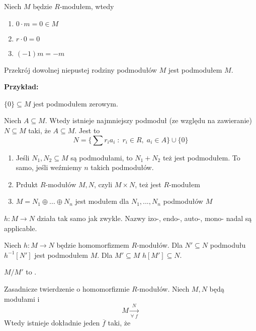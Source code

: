 \begin{remark}
    Niech $M$ będzie $R$-modułem, wtedy
    \begin{enumerate}
    \item $0\cdot m=0\in M$
    \item $r\cdot 0=0$
    \item $(-1)m=-m$
    \end{enumerate}
\end{remark}

\begin{remark}
Przekrój dowolnej niepustej rodziny podmodułów $M$ jest podmodułem $M$.
\end{remark}

\textbf{Przykład:}

$\{0\}\subseteq M$ jest podmodułem zerowym.

\begin{conclusion}
    Niech $A\subseteq M$. Wtedy istnieje najmniejszy podmoduł (ze względu na zawieranie) $N\subseteq M$ taki, że $A\subseteq M$. Jest to 
    $$N=\{\sum r_ia_i\;:\;r_i\in R,\;a_i\in A\}\cup\{0\}$$
\end{conclusion}

\begin{enumerate}
    \item Jeśli $N_1,N_2\subseteq M$ są podmodułami, to $N_1+N_2$ też jest podmodułem. To samo, jeśli weźmiemy $n$ takich podmodułów.
    \item Prdukt $R$-modułów $M,N$, czyli $M\times N$, też jest $R$-modułem
    \item $M=N_1\oplus...\oplus N_n$ jest modułem dla $N_1,...,N_n$ podmodułów $M$
\end{enumerate}

 $h:M\to N$ działa tak samo jak zwykle. Nazwy izo-, endo-, auto-, mono- nadal są applicable.

Niech $h:M\to N$ będzie homomorfizmem $R$-modułów. Dla $N'\subseteq N$ podmodułu $h^{-1}[N']$ jest podmodułem $M$. Dla $M'\subseteq M$ $h[M']\subseteq N$. 

$M/M'$ to .

\begin{theorem} Zasadnicze twierdzenie o homomorfizmie $R$-modułów. Niech $M,N$ będą modułami i
$$M\xrightarrow[\forall\;f]N$$
Wtedy istnieje dokładnie jeden $\overline f$ taki, że

\begin{center}
\end{center}

\end{theorem}


